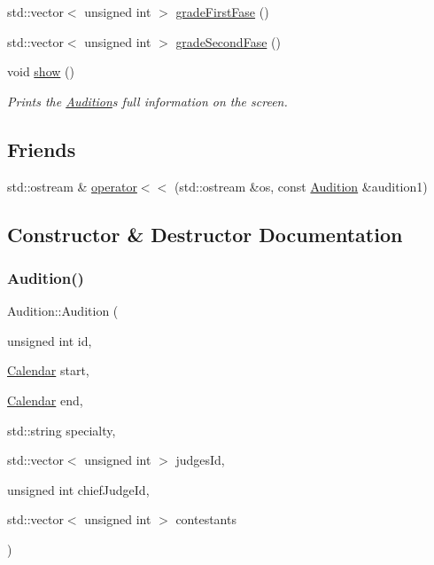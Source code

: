 \begin{DoxyCompactItemize}
\item 
std\+::vector$<$ unsigned int $>$ \hyperlink{class_audition_a5fb1b67448d24aa4f854836470c5c83d}{grade\+First\+Fase} ()
\item 
std\+::vector$<$ unsigned int $>$ \hyperlink{class_audition_a0d7322e61cd758dc9b29d77a6d55de70}{grade\+Second\+Fase} ()
\item 
\mbox{\label{class_audition_a01582041dd15068e976e069d87a3b440}} 
void \hyperlink{class_audition_a01582041dd15068e976e069d87a3b440}{show} ()
\begin{DoxyCompactList}\small\item\em Prints the \hyperlink{class_audition}{Audition}\textquotesingle{}s full information on the screen. \end{DoxyCompactList}\end{DoxyCompactItemize}
\subsection*{Friends}
\begin{DoxyCompactItemize}
\item 
std\+::ostream \& \hyperlink{class_audition_a67ea98e4a54230ec3836fea39695ff8d}{operator$<$$<$} (std\+::ostream \&os, const \hyperlink{class_audition}{Audition} \&audition1)
\end{DoxyCompactItemize}


\subsection{Constructor \& Destructor Documentation}
\mbox{\label{class_audition_aba9121b34d5f4064cefee6afa099bfa8}} 
\subsubsection{\texorpdfstring{Audition()}{Audition()}}
{\footnotesize\ttfamily Audition\+::\+Audition (\begin{DoxyParamCaption}\item[{unsigned int}]{id,  }\item[{\hyperlink{class_calendar}{Calendar}}]{start,  }\item[{\hyperlink{class_calendar}{Calendar}}]{end,  }\item[{std\+::string}]{specialty,  }\item[{std\+::vector$<$ unsigned int $>$}]{judges\+Id,  }\item[{unsigned int}]{chief\+Judge\+Id,  }\item[{std\+::vector$<$ unsigned int $>$}]{contestants }\end{DoxyParamCaption})}



